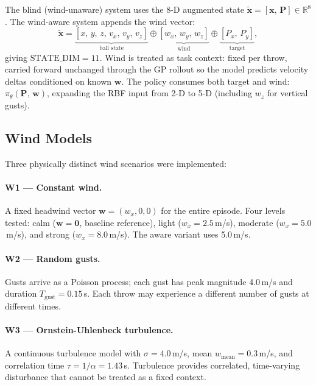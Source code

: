 The blind (wind-unaware) system uses the 8-D augmented state
$\tilde{\mathbf{x}} = [\mathbf{x},\, \mathbf{P}] \in \mathbb{R}^8$.
The wind-aware system appends the wind vector:
\begin{equation}
  \tilde{\mathbf{x}} =
    \underbrace{[x,\, y,\, z,\, v_x,\, v_y,\, v_z]}_{\text{ball state}}
    \oplus
    \underbrace{[w_x,\, w_y,\, w_z]}_{\text{wind}}
    \oplus
    \underbrace{[P_x,\, P_y]}_{\text{target}},
  \label{eq:wind_state}
\end{equation}
giving $\mathrm{STATE\_DIM} = 11$.
Wind is treated as task context: fixed per throw, carried forward unchanged through the
GP rollout so the model predicts velocity deltas conditioned on known $\mathbf{w}$.
The policy consumes both target and wind: $\pi_\theta(\mathbf{P},\, \mathbf{w})$,
expanding the RBF input from 2-D to 5-D (including $w_z$ for vertical gusts).

\subsection{Wind Models}
\label{sec:study4:windmodels}

Three physically distinct wind scenarios were implemented:

\paragraph{W1 — Constant wind.}
A fixed headwind vector $\mathbf{w} = (w_x, 0, 0)$ for the entire episode.
Four levels tested: calm ($\mathbf{w} = \mathbf{0}$, baseline reference), light
($w_x = 2.5$\,m/s), moderate ($w_x = 5.0$\,m/s), and strong ($w_x = 8.0$\,m/s).
The aware variant uses 5.0\,m/s.

\paragraph{W2 — Random gusts.}
Gusts arrive as a Poisson process; each gust has peak magnitude 4.0\,m/s and duration
$T_{\mathrm{gust}} = 0.15$\,s.
Each throw may experience a different number of gusts at different times.

\paragraph{W3 — Ornstein-Uhlenbeck turbulence.}
A continuous turbulence model with $\sigma = 4.0$\,m/s, mean $w_{\mathrm{mean}} = 0.3$\,m/s,
and correlation time $\tau = 1/\alpha = 1.43$\,s.
Turbulence provides correlated, time-varying disturbance that cannot be treated as
a fixed context.


